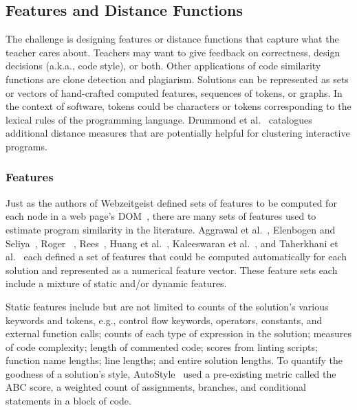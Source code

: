 
\subsection{Features and Distance Functions}

The challenge is designing features or distance functions that capture what the teacher cares about. Teachers may want to give feedback on correctness, design decisions (a.k.a., code style), or both. Other applications of code similarity functions are clone detection and plagiarism. Solutions can be represented as sets or vectors of hand-crafted computed features, sequences of tokens, or graphs. In the context of software, tokens could be characters or tokens corresponding to the lexical rules of the programming language. Drummond et al.~\cite{drummond2014learning} catalogues additional distance measures that are potentially helpful for clustering interactive programs.

\subsubsection{Features}
Just as the authors of Webzeitgeist defined sets of features to be computed for each node in a web page's DOM~\cite{webzeitgeist}, there are many sets of features used to estimate program similarity in the literature. Aggrawal et al.~\cite{srikant2014system}, Elenbogen and Seliya~\cite{Elenbogen}, Roger ~\cite{ACESthesis}, Rees~\cite{Rees:1982}, Huang et al.~\cite{MOOCshop}, Kaleeswaran et al.~\cite{kaleeswaran2016semi}, and Taherkhani et al.~\cite{taherkhani2010recognizing} each defined a set of features that could be computed automatically for each solution and represented as a numerical feature vector. These feature sets each include a mixture of static and/or dynamic features.

Static features include but are not limited to counts of the solution's various keywords and tokens, e.g., control flow keywords, operators, constants, and external function calls; counts of each type of expression in the solution;  measures of code complexity; length of commented code; scores from linting scripts; function name lengths; line lengths; and entire solution lengths. To quantify the goodness of a solution's style, AutoStyle~\cite{choudhury2016autostyle} used a pre-existing metric called the ABC score, a weighted count of assignments, branches, and conditional statements in a block of code.

